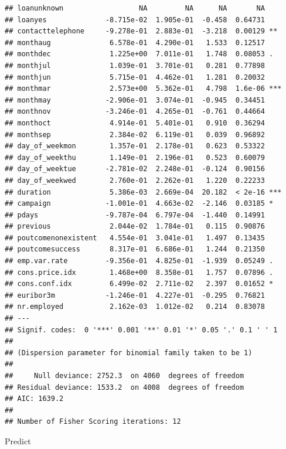 \documentclass[
]{article}
\begin{document}
\begin{verbatim}
## loanunknown                  NA         NA      NA       NA    
## loanyes              -8.715e-02  1.905e-01  -0.458  0.64731    
## contacttelephone     -9.278e-01  2.883e-01  -3.218  0.00129 ** 
## monthaug              6.578e-01  4.290e-01   1.533  0.12517    
## monthdec              1.225e+00  7.011e-01   1.748  0.08053 .  
## monthjul              1.039e-01  3.701e-01   0.281  0.77898    
## monthjun              5.715e-01  4.462e-01   1.281  0.20032    
## monthmar              2.573e+00  5.362e-01   4.798  1.6e-06 ***
## monthmay             -2.906e-01  3.074e-01  -0.945  0.34451    
## monthnov             -3.246e-01  4.265e-01  -0.761  0.44664    
## monthoct              4.914e-01  5.401e-01   0.910  0.36294    
## monthsep              2.384e-02  6.119e-01   0.039  0.96892    
## day_of_weekmon        1.357e-01  2.178e-01   0.623  0.53322    
## day_of_weekthu        1.149e-01  2.196e-01   0.523  0.60079    
## day_of_weektue       -2.781e-02  2.248e-01  -0.124  0.90156    
## day_of_weekwed        2.760e-01  2.262e-01   1.220  0.22233    
## duration              5.386e-03  2.669e-04  20.182  < 2e-16 ***
## campaign             -1.001e-01  4.663e-02  -2.146  0.03185 *  
## pdays                -9.787e-04  6.797e-04  -1.440  0.14991    
## previous              2.044e-02  1.784e-01   0.115  0.90876    
## poutcomenonexistent   4.554e-01  3.041e-01   1.497  0.13435    
## poutcomesuccess       8.317e-01  6.686e-01   1.244  0.21350    
## emp.var.rate         -9.356e-01  4.825e-01  -1.939  0.05249 .  
## cons.price.idx        1.468e+00  8.358e-01   1.757  0.07896 .  
## cons.conf.idx         6.499e-02  2.711e-02   2.397  0.01652 *  
## euribor3m            -1.246e-01  4.227e-01  -0.295  0.76821    
## nr.employed           2.162e-03  1.012e-02   0.214  0.83078    
## ---
## Signif. codes:  0 '***' 0.001 '**' 0.01 '*' 0.05 '.' 0.1 ' ' 1
## 
## (Dispersion parameter for binomial family taken to be 1)
## 
##     Null deviance: 2752.3  on 4060  degrees of freedom
## Residual deviance: 1533.2  on 4008  degrees of freedom
## AIC: 1639.2
## 
## Number of Fisher Scoring iterations: 12
\end{verbatim}

Predict
\end{document}
